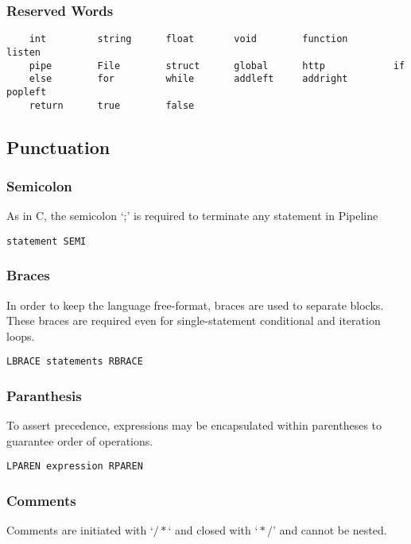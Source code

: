 \documentclass[./Report_main.tex]{subfiles}
\begin{document}
\subsubsection{Reserved Words}
\begin{lstlisting}
	int         string      float		void		function        listen
    pipe        File        struct      global      http            if
    else        for         while       addleft     addright        popleft
    return      true        false
\end{lstlisting}
\subsection{Punctuation}
\subsubsection{Semicolon}
As in C, the semicolon ‘;’ is required to terminate any statement in Pipeline
\begin{lstlisting}
statement SEMI
\end{lstlisting}

\subsubsection{Braces}
In order to keep the language free-format, braces are used to separate blocks. These braces are required even for single-statement conditional and iteration loops. 
\begin{lstlisting}
LBRACE statements RBRACE
\end{lstlisting}

\subsubsection{Paranthesis}
To assert precedence, expressions may be encapsulated within parentheses to guarantee order of operations.
\begin{lstlisting}
LPAREN expression RPAREN
\end{lstlisting}

\subsubsection{Comments }
Comments are initiated with $‘/* ‘$ and closed with $‘*/’$ and cannot be nested.


\end{document}
